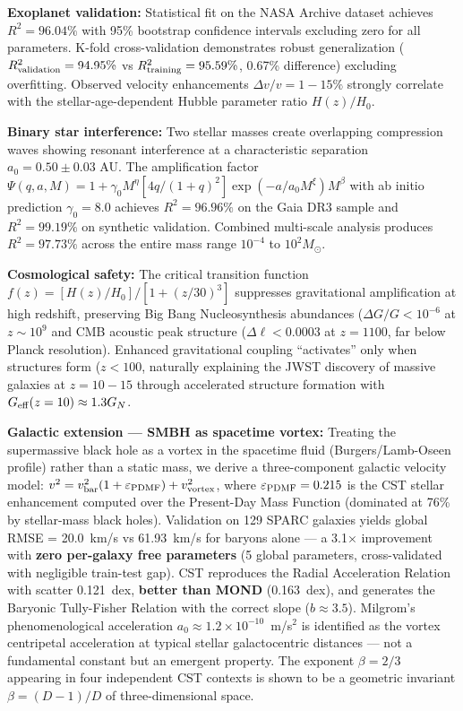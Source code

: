 \documentclass[10pt,a4paper]{article}
\begin{document}
\textbf{Exoplanet validation:} Statistical fit on the NASA Archive
dataset achieves \(R^2 = 96.04\%\) with 95\% bootstrap confidence
intervals excluding zero for all parameters. K-fold cross-validation
demonstrates robust generalization (\(R^2_{\rm validation} = 94.95\%\)
vs \(R^2_{\rm training} = 95.59\%\), 0.67\% difference) excluding
overfitting. Observed velocity enhancements \(\Delta v/v = 1-15\%\)
strongly correlate with the stellar-age-dependent Hubble parameter ratio
\(H(z)/H_0\).

\textbf{Binary star interference:} Two stellar masses create overlapping
compression waves showing resonant interference at a characteristic
separation \(a_0 = 0.50 \pm 0.03\) AU. The amplification factor
\(\Psi(q,a,M) = 1 + \gamma_0 M^\eta [4q/(1+q)^2] \exp(-a/a_0 M^\xi) M^\beta\)
with ab initio prediction \(\gamma_0 = 8.0\) achieves \(R^2 = 96.96\%\)
on the Gaia DR3 sample and \(R^2 = 99.19\%\) on synthetic validation.
Combined multi-scale analysis produces \(R^2 = 97.73\%\) across the
entire mass range \(10^{-4}\) to \(10^2 M_\odot\).

\textbf{Cosmological safety:} The critical transition function
\(f(z) = [H(z)/H_0]/[1+(z/30)^3]\) suppresses gravitational
amplification at high redshift, preserving Big Bang Nucleosynthesis \cite{Cyburt2016}
abundances (\(\Delta G/G < 10^{-6}\) at \(z \sim 10^9\) and CMB \cite{PlanckCollaboration2020b}
acoustic peak structure (\(\Delta\ell < 0.0003\) at \(z=1100\), far
below Planck resolution). Enhanced gravitational coupling ``activates''
only when structures form (\(z < 100\), naturally explaining the JWST
discovery of massive galaxies at \(z = 10-15\) through accelerated
structure formation with \(G_{\rm eff}(z=10) \approx 1.3 G_N\).

\textbf{Galactic extension --- SMBH as spacetime vortex:} Treating the supermassive black hole as a vortex in the spacetime fluid (Burgers/Lamb-Oseen profile) rather than a static mass, we derive a three-component galactic velocity model: $v^2 = v_{\rm bar}^2(1 + \varepsilon_{\rm PDMF}) + v_{\rm vortex}^2$, where $\varepsilon_{\rm PDMF} = 0.215$ is the CST stellar enhancement computed over the Present-Day Mass Function (dominated at 76\% by stellar-mass black holes). Validation on 129 SPARC galaxies \cite{Lelli2016} yields global RMSE = 20.0~km/s vs 61.93~km/s for baryons alone --- a 3.1$\times$ improvement with \textbf{zero per-galaxy free parameters} (5 global parameters, cross-validated with negligible train-test gap). CST reproduces the Radial Acceleration Relation \cite{McGaugh2016} with scatter 0.121~dex, \textbf{better than MOND} (0.163~dex), and generates the Baryonic Tully-Fisher Relation with the correct slope ($b \approx 3.5$). Milgrom's phenomenological acceleration $a_0 \approx 1.2 \times 10^{-10}$~m/s$^2$ is identified as the vortex centripetal acceleration at typical stellar galactocentric distances --- not a fundamental constant but an emergent property. The exponent $\beta = 2/3$ appearing in four independent CST contexts is shown to be a geometric invariant $\beta = (D-1)/D$ of three-dimensional space.
\end{document}
